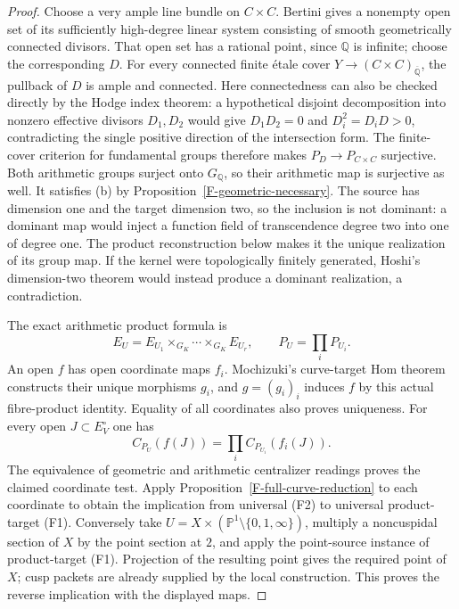 \begin{proof}
Choose a very ample line bundle on $C\times C$. Bertini gives
a nonempty open set of its sufficiently high-degree linear
system consisting of smooth geometrically connected divisors.
That open set has a rational point, since $\mathbb Q$ is
infinite; choose the corresponding $D$. For every connected
finite \'etale cover $Y\to(C\times C)_{\overline{\mathbb Q}}$,
the pullback of $D$ is ample and connected. Here connectedness
can also be checked directly by the Hodge index theorem:
a hypothetical disjoint decomposition into nonzero effective
divisors $D_1,D_2$ would give
$D_1D_2=0$ and $D_i^2=D_iD>0$, contradicting the single
positive direction of the intersection form. The finite-cover
criterion for fundamental groups therefore makes
$P_D\to P_{C\times C}$ surjective. Both arithmetic groups
surject onto $G_{\mathbb Q}$, so their arithmetic map is
surjective as well. It satisfies (b) by
Proposition~\ref{F-geometric-necessary}. The source has
dimension one and the target dimension two, so the inclusion
is not dominant: a dominant map would inject a function field
of transcendence degree two into one of degree one.
The product reconstruction below makes it the unique
realization of its group map. If the kernel were topologically
finitely generated, Hoshi's dimension-two theorem would instead
produce a dominant realization, a contradiction.

The exact arithmetic product formula is
\[
 E_U=E_{U_1}\times_{G_K}\cdots\times_{G_K}E_{U_r},
 \qquad P_U=\prod_iP_{U_i}.
\]
An open $f$ has open coordinate maps $f_i$. Mochizuki's
curve-target Hom theorem constructs their unique morphisms
$g_i$, and $g=(g_i)_i$ induces $f$ by this actual fibre-product
identity. Equality of all coordinates also proves uniqueness.
For every open $J\subset E_V^\circ$ one has
\[
 C_{P_U}(f(J))=\prod_i C_{P_{U_i}}(f_i(J)).
\]
The equivalence of geometric and arithmetic centralizer
readings proves the claimed coordinate test. Apply
Proposition~\ref{F-full-curve-reduction} to each coordinate
to obtain the implication from universal (F2) to universal
product-target (F1). Conversely take $U=X\times
(\mathbb P^1\setminus\{0,1,\infty\})$, multiply a noncuspidal
section of $X$ by the point section at $2$, and apply the
point-source instance of product-target (F1). Projection of
the resulting point gives the required point of $X$; cusp
packets are already supplied by the local construction.
This proves the reverse implication with the displayed maps.
\end{proof}

